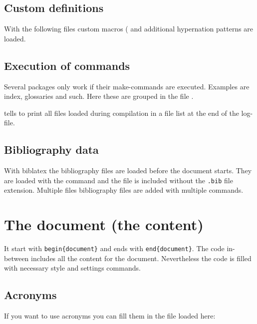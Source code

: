 \subsection{Custom definitions}
With the following files custom macros ( and additional hypernation patterns  are loaded. 

\subsection{Execution of commands}
\label{sec:ExecutionOfCommands}
Several packages only work if their make-commands are executed. Examples are index, glossaries and such. Here these are grouped in the file . 

 tells \latex to print all files loaded during compilation in a file list at the end of the log-file.
%

\subsection{Bibliography data}
With biblatex the bibliography files are loaded before the document starts. 
They are loaded with the command  and the file is included without the \texttt{.bib} file extension. Multiple files bibliography files are added with multiple  commands.

\section{The document (the content)}
It start with \texttt{\bs{}begin\{document\}} and ends with \texttt{\bs{}end\{document\}}.
The code in-between includes all the content for the document. Nevertheless the code is filled with necessary style and settings commands.

\subsection{Acronyms}
If you want to use acronyms you can fill them in the file loaded here:
%
